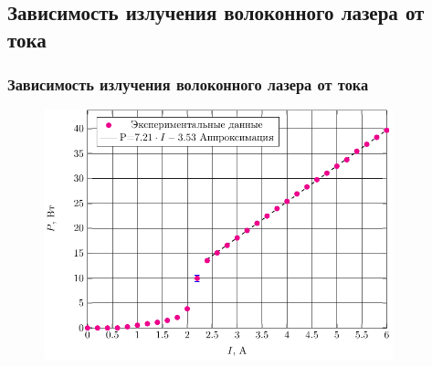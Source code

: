 \documentclass[10pt,pdf,hyperref={unicode}, dvipsnames]{beamer}
\newcommand\frametitless[1]{\subsection{#1}\frametitle{#1}}
\begin{document}
\begin{frame}[t]
	\frametitless{Зависимость излучения волоконного лазера от тока}
		\begin{figure}[tb]
		\centering
		\includegraphics[width=0.9\textwidth]{img/PI}
	\end{figure}
\end{frame}
\end{document}
